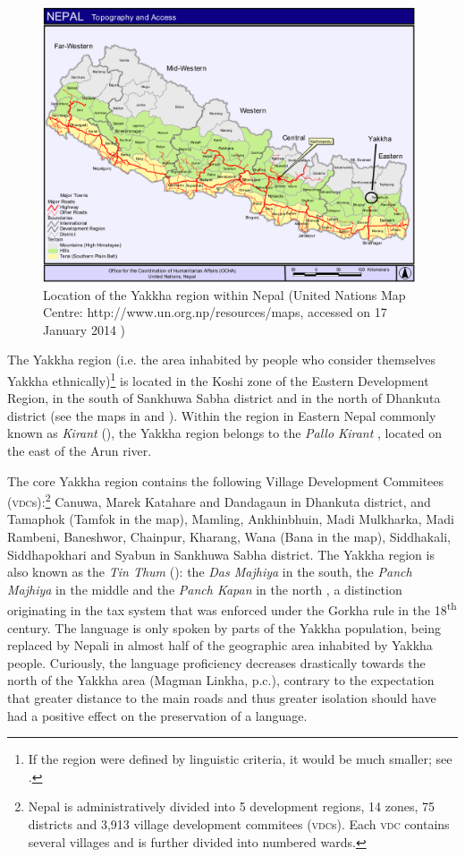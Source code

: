 \begin{figure}
\centering
\includegraphics[width=11cm]{figures/Nepalkarte.pdf}
\caption{Location of the Yakkha region within Nepal (United Nations Map Centre: http://www.un.org.np/resources/maps, accessed on 17 January 2014 )}\label{nepalmap}
\end{figure}

The Yakkha region (i.e. the area inhabited by people who consider themselves Yakkha ethnically)\footnote{If the region were defined by linguistic criteria, it would be much smaller; see .} is located in the Koshi zone of the Eastern Development Region, in the south of Sankhuwa Sabha district and in the north of Dhankuta  district  (see the maps in  and ). Within the region in  Eastern Nepal commonly known as \emph{Kirant} (), the Yakkha region belongs to the \emph{Pallo Kirant} , located on the east of the Arun river. 

The core Yakkha region contains the following Village Development Commitees (\textsc{vdc}s):\footnote{Nepal is administratively divided into 5 development regions, 14 zones, 75 districts and  3,913 village development commitees (\textsc{vdc}s). Each \textsc{vdc}  contains several villages and is further divided into numbered wards.} Canuwa, Marek Katahare and Dandagaun in Dhankuta district, and Tamaphok (Tamfok in the map), Mamling, Ankhinbhuin, Madi Mulkharka, Madi Rambeni, Baneshwor, Chainpur, Kharang, Wana (Bana in the map), Siddhakali, Siddhapokhari and Syabun in Sankhuwa Sabha district. The Yakkha region is also known as the \emph{Tin Thum} (): the \emph{Das Majhiya} in the south, the \emph{Panch Majhiya} in the middle and the \emph{Panch Kapan} in the north  \citep[86]{Kongren2007Indigenous}, a distinction originating in the tax system that was enforced under the Gorkha rule in the 18\textsuperscript{th} century. The language is  only spoken by parts of the Yakkha population, being replaced by Nepali in almost half of the geographic area inhabited by Yakkha people. Curiously, the language proficiency decreases drastically towards the north of the Yakkha area (Magman Linkha, p.c.), contrary to the expectation that greater distance to the main roads and thus greater isolation should have had a positive effect on the preservation of a language. 




